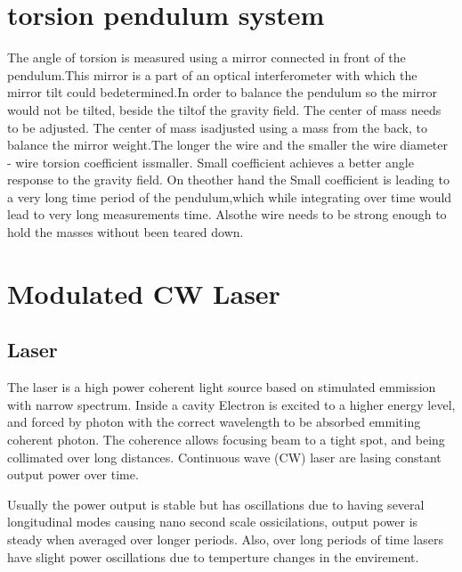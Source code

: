 \documentclass[\main/master.tex]{subfiles}
\begin{document}
\section{torsion pendulum system}
The angle of torsion is measured using a mirror connected in front of the pendulum.This mirror is a part of an optical interferometer with which the mirror tilt could bedetermined.In order to balance the pendulum so the mirror would not be tilted, beside the tiltof the gravity field. The center of mass needs to be adjusted. The center of mass isadjusted using a mass from the back, to balance the mirror weight.The longer the wire and the smaller the wire diameter - wire torsion coefficient issmaller. Small coefficient achieves a better angle response to the gravity field. On theother hand the Small coefficient is leading to a very long time period of the pendulum,which while integrating over time would lead to very long measurements time. Alsothe wire needs to be strong enough to hold the masses without been teared down.


\section{Modulated CW Laser}

\subsection{Laser}


The laser is a high power coherent light source based on stimulated emmission with narrow spectrum. Inside a cavity Electron is excited to a higher energy level, and forced by photon with the correct wavelength to be absorbed emmiting coherent photon. The coherence allows focusing beam to a tight spot, and being collimated over long distances. Continuous wave (CW) laser are lasing constant output power over time.



\par
Usually the power output is stable but has oscillations due to having several longitudinal modes causing nano second scale ossicilations, output power is steady when averaged over longer periods. Also, over long periods of time lasers have slight power oscillations due to temperture changes in the envirement.
\end{document}
